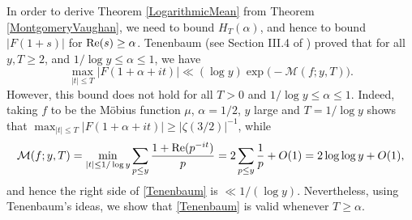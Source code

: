 \documentclass[12pt]{amsart}
\theoremstyle{definition}
\numberwithin{equation}{section}
\newcommand{\re}{\textup{Re}}
\begin{document}
In order to derive Theorem \ref{LogarithmicMean} from Theorem \ref{MontgomeryVaughan}, we need to bound $H_{T}(\alpha)$, and hence to bound $|F(1+s)|$ for $\re(s)\geq \alpha$. 
Tenenbaum (see Section III.4 of \cite{Te}) proved that for all $y, T\geq 2$, and $1/\log y\leq \alpha\leq 1$, we have 
\begin{equation}\label{Tenenbaum}
\max_{|t|\leq T}|F(1+\alpha+it)|\ll (\log y) \exp\big(-\mathcal{M}(f; y, T)\big).
\end{equation}
However, this bound does not hold for all $T>0$ and $1/\log y\leq \alpha\leq 1$. Indeed, taking $f$ to be the M\"obius function $\mu$, $\alpha=1/2$,  $y$ large and $T=1/\log y$ shows that $\max_{|t|\leq T}|F(1+\alpha+it)|\geq |\zeta(3/2)|^{-1}$, while
$$ \mathcal{M}(f; y, T)= \min_{|t|\leq 1/\log y} \sum_{p\leq y} \frac{1+ \re(p^{-it})}{p}=
2\sum_{p\leq y} \frac{1}{p}+O(1)=2\log\log y+O(1),$$ 
and hence the right side of \eqref{Tenenbaum} is $\ll 1/(\log y)$. Nevertheless, using Tenenbaum's ideas, we show that \eqref{Tenenbaum} is valid whenever $T\geq \alpha$. 
\end{document}
